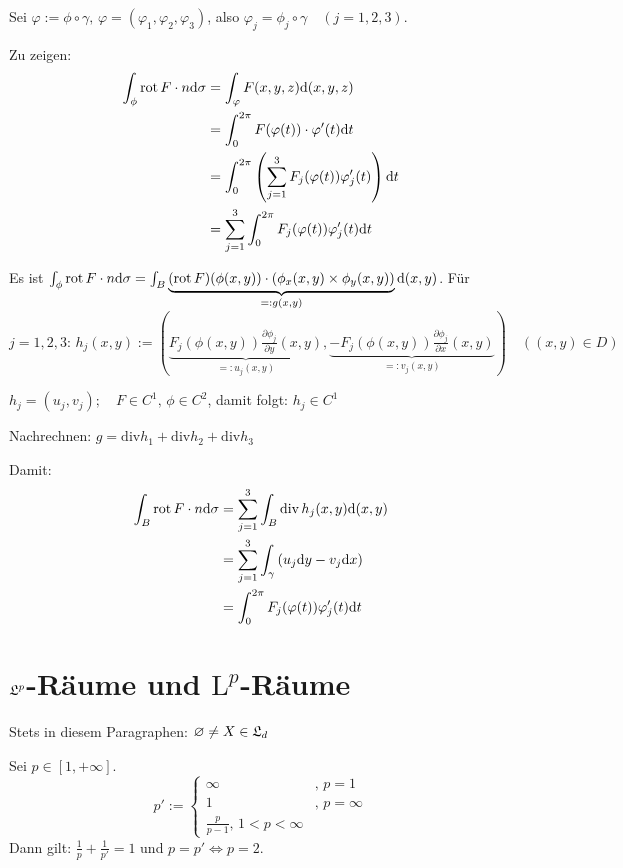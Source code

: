 \documentclass[a4paper,twoside,DIV15,BCOR12mm,chapterprefix=true,headings=onelinechapter]{scrbook}
\begin{document}
\begin{beweis}
Sei \(\varphi:=\phi\circ\gamma,\,\varphi=(\varphi_{1},\varphi_{2},\varphi_{3})\), also 
    \(\varphi_{j}=\phi_{j}\circ\gamma\quad(j=1,2,3)\).

Zu zeigen:
\begin{align*}
\int_{\phi}{\mathop{\rm rot}\nolimits F\cdot n\mathrm{d}\sigma}
    &=\int_{\varphi}{F(x,y,z)\mathrm{d}(x,y,z)}\\
    &=\int_{0}^{2\pi}{F(\varphi(t))\cdot\varphi'(t)\mathrm{d}t}\\
    &=\int_{0}^{2\pi}{\left(\sum_{j=1}^{3}{F_{j}(\varphi(t))\varphi_{j}'(t)}\right)\mathrm{d}t}\\
    &=\sum_{j=1}^{3}{\int_{0}^{2\pi}{F_{j}(\varphi(t))\varphi_{j}'(t)\mathrm{d}t}}
\end{align*}

Es ist \(\int_{\phi}{\mathop{\rm rot}\nolimits F\cdot n\mathrm{d}\sigma}=\int_{B}{\underbrace{(\mathop{\rm rot}\nolimits F)(\phi(x,y))\cdot(\phi_{x}(x,y)\times\phi_{y}(x,y))}_{=:g(x,y)}\mathrm{d}(x,y)}\).
F\"ur \(j=1,2,3:\,h_{j}(x,y):=(\underbrace{F_{j}(\phi(x,y))\frac{\partial\phi_{j}}{\partial y}(x,y)}_{=:u_{j}(x,y)},\underbrace{-F_{j}(\phi(x,y))\frac{\partial\phi_{j}}{\partial x}(x,y)}_{=:v_{j}(x,y)})\quad((x,y)\in D)\)


\(h_{j}=(u_{j},v_{j});\quad F\in C^{1},\,\phi\in C^{2}\), damit folgt: \(h_{j}\in C^{1}\)

Nachrechnen: \(g=\mathrm{div} h_{1}+\mathrm{div} h_{2}+\mathrm{div} h_{3}\)

Damit:
\begin{align*}
\int_{B}{\mathop{\rm rot}\nolimits F\cdot n\mathrm{d}\sigma}
    &=\sum_{j=1}^{3}{\int_{B}{\mathrm{div}\,h_{j}(x,y)\mathrm{d}(x,y)}}\\
    &=\sum_{j=1}^{3}{\int_{\gamma}{(u_{j}\mathrm{d}y-v_{j}\mathrm{d}x)}}\\
    &=\int_{0}^{2\pi}{F_{j}(\varphi(t))\varphi_{j}'(t)\mathrm{d}t}
\end{align*}
\end{beweis}

\chapter{$\mathfrak{L}^{p}$-R\"aume und $\mathrm{L}^{p}$-R\"aume}

Stets in diesem Paragraphen: \(\varnothing\neq X\in\mathfrak{L}_{d}\)

\begin{definition}
Sei \(p\in[1,+\infty]\).
\[
p':=\begin{cases}
\infty&,\,p=1\\
1&,\,p=\infty\\
\frac{p}{p-1},\,1<p<\infty
\end{cases}
\]
Dann gilt: \(\frac{1}{p}+\frac{1}{p'}=1\) und \(p=p'\Leftrightarrow p=2\).
\end{definition}
\end{document}
